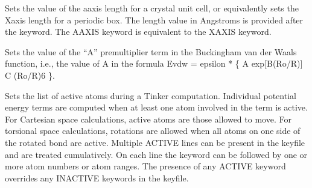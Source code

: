 \documentclass[letterpaper,11pt,english]{sphinxmanual}
\begin{document}
\ignorespaces {}\label{\detokenize{text/keywords:key-a-axis}}\begin{description}
\sphinxAtStartPar
Sets the value of the a\sphinxhyphen{}axis length for a crystal unit cell, or equivalently sets the X\sphinxhyphen{}axis length for a periodic box. The length value in Angstroms is provided after the keyword. The A\sphinxhyphen{}AXIS keyword is equivalent to the X\sphinxhyphen{}AXIS keyword.

\end{description}

\ignorespaces {}\label{\detokenize{text/keywords:key-a-expterm}}\begin{description}
\sphinxAtStartPar
Sets the value of the “A” premultiplier term in the Buckingham van der Waals function, i.e., the value of A in the formula Evdw = epsilon * \{ A exp{[}\sphinxhyphen{}B(Ro/R){]} \sphinxhyphen{} C (Ro/R)6 \}.

\end{description}

\ignorespaces {}\label{\detokenize{text/keywords:key-active}}\begin{description}
\sphinxAtStartPar
Sets the list of active atoms during a Tinker computation. Individual potential energy terms are computed when at least one atom involved in the term is active. For Cartesian space calculations, active atoms are those allowed to move. For torsional space calculations, rotations are allowed when all atoms on one side of the rotated bond are active. Multiple ACTIVE lines can be present in the keyfile and are treated cumulatively.  On each line the keyword can be followed by one or more atom numbers or atom ranges. The presence of any ACTIVE keyword overrides any INACTIVE keywords in the keyfile.

\end{description}
\end{document}
